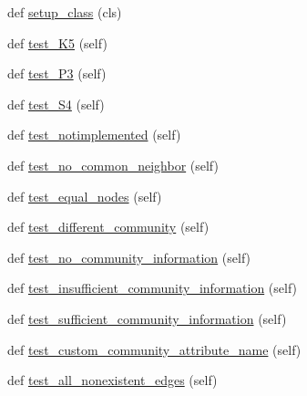 \begin{DoxyCompactItemize}
\item 
def \hyperlink{classnetworkx_1_1algorithms_1_1tests_1_1test__link__prediction_1_1TestCNSoundarajanHopcroft_ad839aeedc6f12c1f87243fcd3ef141fe}{setup\+\_\+class} (cls)
\item 
def \hyperlink{classnetworkx_1_1algorithms_1_1tests_1_1test__link__prediction_1_1TestCNSoundarajanHopcroft_abb0088fe9494748e90a6f7c94ba6b6ce}{test\+\_\+\+K5} (self)
\item 
def \hyperlink{classnetworkx_1_1algorithms_1_1tests_1_1test__link__prediction_1_1TestCNSoundarajanHopcroft_a4f19fc0b7aef074a9df94d1976dc5925}{test\+\_\+\+P3} (self)
\item 
def \hyperlink{classnetworkx_1_1algorithms_1_1tests_1_1test__link__prediction_1_1TestCNSoundarajanHopcroft_aa4d92f366f1f19c54ca276dacb39033e}{test\+\_\+\+S4} (self)
\item 
def \hyperlink{classnetworkx_1_1algorithms_1_1tests_1_1test__link__prediction_1_1TestCNSoundarajanHopcroft_a49258cd1da78f7240e8f0b1fe2c75ff8}{test\+\_\+notimplemented} (self)
\item 
def \hyperlink{classnetworkx_1_1algorithms_1_1tests_1_1test__link__prediction_1_1TestCNSoundarajanHopcroft_ac2eeb053026fa9d0a1bcf997066a8add}{test\+\_\+no\+\_\+common\+\_\+neighbor} (self)
\item 
def \hyperlink{classnetworkx_1_1algorithms_1_1tests_1_1test__link__prediction_1_1TestCNSoundarajanHopcroft_a903617524dadaa9cd67c06d5d1525b11}{test\+\_\+equal\+\_\+nodes} (self)
\item 
def \hyperlink{classnetworkx_1_1algorithms_1_1tests_1_1test__link__prediction_1_1TestCNSoundarajanHopcroft_a4031b79189f87274c2d9356c80bd48be}{test\+\_\+different\+\_\+community} (self)
\item 
def \hyperlink{classnetworkx_1_1algorithms_1_1tests_1_1test__link__prediction_1_1TestCNSoundarajanHopcroft_a363ef64a515e489f1cd39894f0da269d}{test\+\_\+no\+\_\+community\+\_\+information} (self)
\item 
def \hyperlink{classnetworkx_1_1algorithms_1_1tests_1_1test__link__prediction_1_1TestCNSoundarajanHopcroft_a5e62a9d7140c11ee9998359c5154ab92}{test\+\_\+insufficient\+\_\+community\+\_\+information} (self)
\item 
def \hyperlink{classnetworkx_1_1algorithms_1_1tests_1_1test__link__prediction_1_1TestCNSoundarajanHopcroft_af1c832b948275519214a2a66aa635dc8}{test\+\_\+sufficient\+\_\+community\+\_\+information} (self)
\item 
def \hyperlink{classnetworkx_1_1algorithms_1_1tests_1_1test__link__prediction_1_1TestCNSoundarajanHopcroft_ae807aafd4df19840781048c03854c463}{test\+\_\+custom\+\_\+community\+\_\+attribute\+\_\+name} (self)
\item 
def \hyperlink{classnetworkx_1_1algorithms_1_1tests_1_1test__link__prediction_1_1TestCNSoundarajanHopcroft_ad820e2edddd28ed2ec1497783726990f}{test\+\_\+all\+\_\+nonexistent\+\_\+edges} (self)
\end{DoxyCompactItemize}
